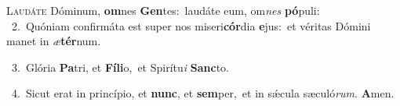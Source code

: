 \lettrine{\initial\textcolor{\initialcolor}{L}}{audáte} Dóminum, \textbf{om}\-nes \textbf{Gen}\-tes:~\star laudáte eum, om\textit{nes} \textbf{pó}\-puli:\\
{\numbfont\textcolor{\numbcolor}{~2.}}~Quóniam confirmáta est super nos miseri\-\textbf{cór}\-dia \textbf{e}\-jus:~\star et véritas Dómini manet in \textit{æ}\-\textbf{tér}num.\par
{\numbfont\textcolor{\numbcolor}{~3.}}~Glória \textbf{Pa}\-tri, et \textbf{Fí}\-\textbf{li}o,~\star et Spirítu\textit{i} \textbf{Sanc}\-to.\par
{\numbfont\textcolor{\numbcolor}{~4.}}~Sicut erat in princípio, et \textbf{nunc}\-, et \textbf{sem}\-per,~\star et in sǽcula sæculó\-\textit{rum}\-. \textbf{A}\-men.\par
